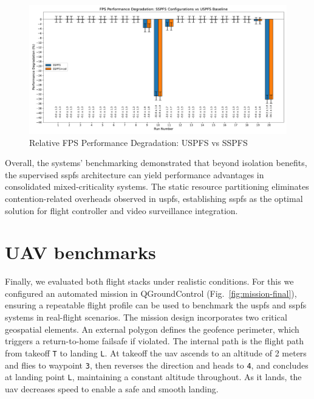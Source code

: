 \begin{figure}[!hbt]
  \centering
  \includegraphics[width=1.0\textwidth]{./img/pdf/cam-sspfs-uspfs} 
  \caption{Relative FPS Performance Degradation: USPFS vs SSPFS}%
  \label{fig:cam-sspfs-uspfs}
\end{figure}

Overall, the systems' benchmarking demonstrated that beyond isolation benefits,
the supervised \gls{sspfs} architecture can yield performance advantages in
consolidated mixed-criticality systems.
The static resource partitioning eliminates contention-related overheads
observed in \gls{uspfs}, establishing \gls{sspfs} as the optimal solution for
flight controller and video surveillance integration.

\section{UAV benchmarks}
\label{sec:uav-benchmarks}
Finally, we evaluated both flight stacks under realistic conditions.
For this we configured an automated mission in QGroundControl
(Fig.~\ref{fig:mission-final}), ensuring a repeatable flight profile can be used
to benchmark the \gls{uspfs} and \gls{sspfs} systems in real-flight scenarios.
%
The mission design incorporates two critical geospatial elements. An
external polygon defines the geofence perimeter, which triggers a
return-to-home failsafe if violated. The internal path is the flight path from
takeoff \lstinline{T} to landing \lstinline{L}. At takeoff the \gls{uav} ascends
to an altitude of 2 meters and flies to waypoint \lstinline{3}, then reverses
the direction and heads to \lstinline{4}, and concludes at landing point
\lstinline{L}, maintaining a constant altitude throughout. As it lands, the \gls{uav} decreases speed to enable a safe and smooth landing.


